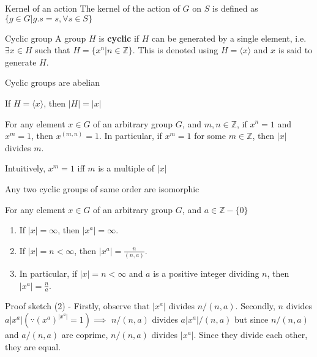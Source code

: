 \documentclass[titlepage, 12pt]{article}
\begin{document}
\begin{definition}{Kernel of an action}{}
    The kernel of the action of $G$ on $S$ is defined as $\{g\in G| g.s = s,
    \forall s\in S\}$
\end{definition}
\begin{definition}{Cyclic group}{}
    A group $H$ is \textbf{cyclic} if $H$ can be generated by a single element,
    i.e. $\exists x\in H$ such that $H = \{x^n| n\in \mathbb{Z}\}$. This is denoted
    using $H = \langle x\rangle$ and $x$ is said to generate $H$.
\end{definition}
\begin{proposition}{}{}
    Cyclic groups are abelian
\end{proposition}
\begin{proposition}{}{}
    If $H = \langle x\rangle$, then $| H| = | x|$
\end{proposition}
\begin{proposition}{}{}
    For any element $x\in G$ of an arbitrary group $G$, and $m, n\in
        \mathbb{Z}$,
        if $x^n = 1$ and $x^m = 1$, then $x^{(m, n)} = 1$. In particular, if
        $x^m = 1$ for some $m\in \mathbb{Z}$, then $|x|$ divides $m$.
\end{proposition}
Intuitively, $x^m = 1$ iff $m$ is a multiple of $|x|$
\begin{proposition}{}{}
    Any two cyclic groups of same order are isomorphic
\end{proposition}
\begin{proposition}{}{}
    For any element $x\in G$ of an arbitrary group $G$, and $a\in
        \mathbb{Z} - \{0\}$
        \begin{enumerate}
            \item If $|x| = \infty$, then $|x^a| = \infty$.
            \item If $|x| = n < \infty$, then $|x^a| = \frac{n}{(n, a)}$.
            \item In particular, if $|x| = n < \infty$ and $a$ is a positive integer
                dividing $n$, then $|x^a| = \frac{n}{a}$.
        \end{enumerate}
\end{proposition}
Proof sketch (2) - Firstly, observe that $|x^a|$ divides $n/(n, a)$. Secondly,
$n$ divides $a|x^a| (\because (x^a)^{|x^a|} = 1)\implies$ $n/(n, a)$ divides
$a|x^a|/(n, a)$ but since $n/(n,
a)$ and $a/(n, a)$ are coprime, $n/(n, a)$ divides $|x^a|$. Since they divide
each other, they are equal.
\end{document}
